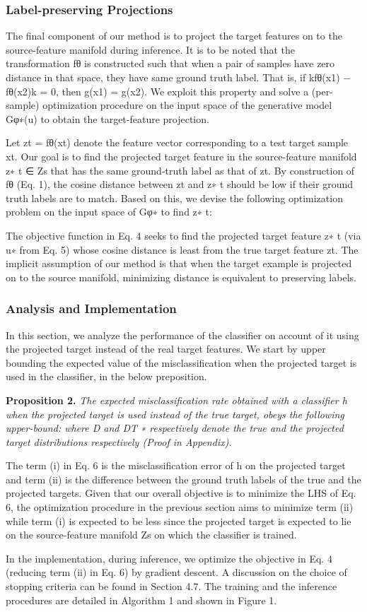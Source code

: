 \documentclass[review]{cvpr}
\begin{document}
\subsubsection{Label-preserving Projections}
The final component of our method is to project the target features on to the source-feature manifold during inference. It is to be noted that the transformation fθ is constructed such that when a pair of samples have zero distance
in that space, they have same ground truth label. That is, if
kfθ(x1) − fθ(x2)k = 0, then g(x1) = g(x2). We exploit
this property and solve a (per-sample) optimization procedure on the input space of the generative model Gφ∗(u) to
obtain the target-feature projection. \par
Let zt = fθ(xt) denote the feature vector corresponding to a test target sample xt. Our goal is to find the projected target feature in the source-feature manifold z∗ t ∈ Zs
that has the same ground-truth label as that of zt. By construction of fθ (Eq. 1), the cosine distance between zt and
z∗
t should be low if their ground truth labels are to match.
Based on this, we devise the following optimization problem on the input space of Gφ∗ to find z∗ t:


The objective function in Eq. 4 seeks to find the projected
target feature z∗ t (via u∗ from Eq. 5) whose cosine distance is least from the true target feature zt. The implicit
assumption of our method is that when the target example
is projected on to the source manifold, minimizing distance
is equivalent to preserving labels.

\subsubsection{Analysis and Implementation}
In this section, we analyze the performance of the classifier
on account of it using the projected target instead of the real
target features. We start by upper bounding the expected
value of the misclassification when the projected target is
used in the classifier, in the below preposition.

\textbf{Proposition 2.} \textit{The expected misclassification rate obtained with a classifier h when the projected target is used
instead of the true target, obeys the following upper-bound: 
where D and DT ∗ respectively denote the true and the projected target distributions respectively (Proof in Appendix).}

The term (i) in Eq. 6 is the misclassification error of h
on the projected target and term (ii) is the difference between the ground truth labels of the true and the projected
targets. Given that our overall objective is to minimize the
LHS of Eq. 6, the optimization procedure in the previous
section aims to minimize term (ii) while term (i) is expected
to be less since the projected target is expected to lie on
the source-feature manifold Zs on which the classifier is
trained. \par
In the implementation, during inference, we optimize the
objective in Eq. 4 (reducing term (ii) in Eq. 6) by gradient
descent. A discussion on the choice of stopping criteria can
be found in Section 4.7. The training and the inference procedures are detailed in Algorithm 1 and shown in Figure 1.
\end{document}
